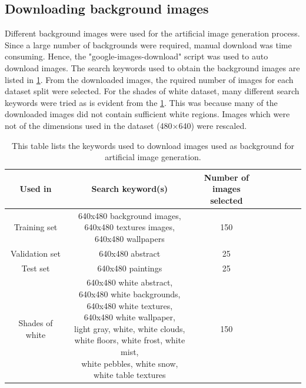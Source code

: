 \subsection{Downloading background images}
Different background images were used for the artificial image generation process. Since a large number of backgrounds were required, manual download was time consuming. Hence, the "google-images-download" \cite{image_downloader} script was used to auto download images. The search keywords used to obtain the background images are listed in \ref{Table:download}. From the downloaded images, the rquired number of images for each dataset split were selected. For the shades of white dataset, many different search keywords were tried as is evident from the \ref{Table:download}. This was because many of the downloaded images did not contain sufficient white regions. Images which were not of the dimensions used in the dataset (480$\times$640) were rescaled.

\begin{table}[!htb]
	\centering
	\begin{tabular}{|c|c|c|c|c|c|c|c|}
	\hline 
    Used in & Search keyword(s) & \makecell{Number of \\images selected} \\ 
	\hline 
	Training set & \makecell{640x480 background images, \\640x480 textures images, \\640x480 wallpapers} & 150 \\ 
	\hline 
	Validation set & 640x480 abstract & 25 \\ 
	\hline 
	Test set & 640x480 paintings & 25 \\ 
	\hline 
	Shades of white & \makecell{640x480 white abstract, \\640x480 white backgrounds, \\640x480 white textures, \\640x480 white wallpaper, \\light gray, white, white clouds, \\white floors, white frost, white mist, \\white pebbles, white snow, \\white table textures} & 150 \\ 
	\hline 
	\end{tabular}
	\caption{This table lists the keywords used to download images used as background for artificial image generation.} 
	\label{Table:download}
\end{table}

